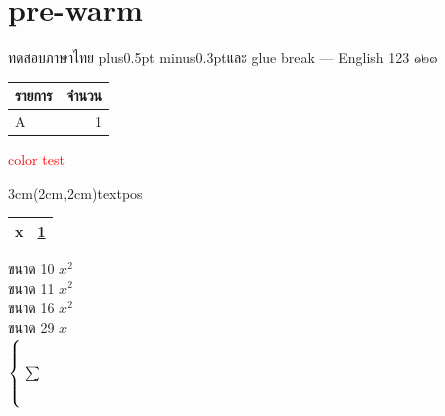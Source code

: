 \documentclass[a4paper,12pt]{article}
\begin{document}
\section*{pre-warm}
ทดสอบภาษาไทย\hskip0pt plus0.5pt minus0.3pt\relax และ glue break — English 123 ๑๒๓
\begin{longtable}{|l|r|}
\hline รายการ & จำนวน \\ \hline
A & 1 \\ \hline
\end{longtable}
\textcolor{red}{color test}
\begin{textblock*}{3cm}(2cm,2cm)textpos\end{textblock*}
\begin{tabularx}{\linewidth}{|X|r|}\hline \multirow{1}{*}{x} & \uline{1} \\ \hline\end{tabularx}
{\fontsize{10pt}{12pt}\selectfont ขนาด 10 $x^2$\\}{\fontsize{11pt}{13pt}\selectfont ขนาด 11 $x^2$\\}
{\fontsize{16pt}{18pt}\selectfont ขนาด 16 $x^2$\\}{\fontsize{29pt}{32pt}\selectfont ขนาด 29 $x$\\}
$\left\{\rule{0pt}{1cm}\right.\sum$ %
\end{document}
